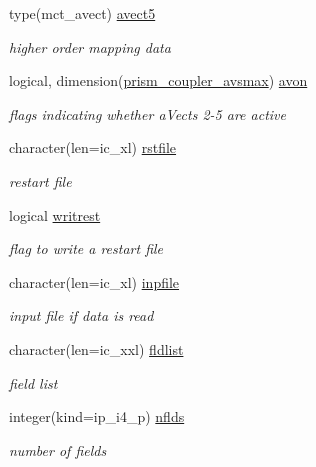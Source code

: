 \begin{DoxyCompactItemize}
type(mct\+\_\+avect) \hyperlink{structmod__oasis__coupler_1_1prism__coupler__type_a939d1987d5c66c2352ff40709f255980}{avect5}
\begin{DoxyCompactList}\small\item\em higher order mapping data \end{DoxyCompactList}\item 
logical, dimension(\hyperlink{namespacemod__oasis__coupler_a6f166f099a134dffba97a168d28a3c01}{prism\+\_\+coupler\+\_\+avsmax}) \hyperlink{structmod__oasis__coupler_1_1prism__coupler__type_aa2090cc6941c0dbbbf4bdb5c68cff873}{avon}
\begin{DoxyCompactList}\small\item\em flags indicating whether a\+Vects 2-\/5 are active \end{DoxyCompactList}\item 
character(len=ic\+\_\+xl) \hyperlink{structmod__oasis__coupler_1_1prism__coupler__type_a8a660e192210d1e8ff71f7dded631dce}{rstfile}
\begin{DoxyCompactList}\small\item\em restart file \end{DoxyCompactList}\item 
logical \hyperlink{structmod__oasis__coupler_1_1prism__coupler__type_ac6ed82fd00e0244b23fa874d62a83c9d}{writrest}
\begin{DoxyCompactList}\small\item\em flag to write a restart file \end{DoxyCompactList}\item 
character(len=ic\+\_\+xl) \hyperlink{structmod__oasis__coupler_1_1prism__coupler__type_a0ecb3c23d7b761aa9bfad0fbb59e40d3}{inpfile}
\begin{DoxyCompactList}\small\item\em input file if data is read \end{DoxyCompactList}\item 
character(len=ic\+\_\+xxl) \hyperlink{structmod__oasis__coupler_1_1prism__coupler__type_a8fa15fcf7d475ade7879d64b4aeb9188}{fldlist}
\begin{DoxyCompactList}\small\item\em field list \end{DoxyCompactList}\item 
integer(kind=ip\+\_\+i4\+\_\+p) \hyperlink{structmod__oasis__coupler_1_1prism__coupler__type_a08fa25cab6817cfbc0c660a4f51d3857}{nflds}
\begin{DoxyCompactList}\small\item\em number of fields \end{DoxyCompactList}\item 

\end{DoxyCompactItemize}
